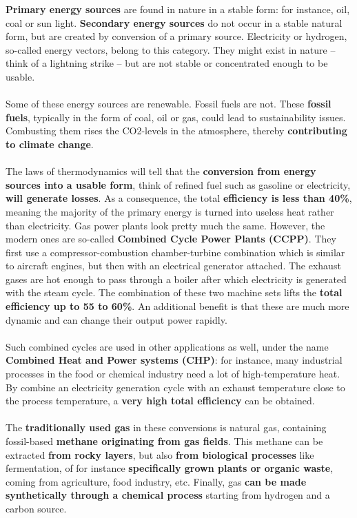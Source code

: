 \documentclass[../summary.tex]{subfiles}
\begin{document}
	\textbf{Primary energy sources} are found in nature in a stable form: for instance, oil, coal or sun light. \textbf{Secondary energy sources} do not occur in a stable natural form, but are created by conversion of a primary source. Electricity or hydrogen, so-called energy vectors, belong to this category. They might exist in nature – think of a lightning strike – but are not stable or concentrated enough to be usable.
	\\\\
	Some of these energy sources are renewable. Fossil fuels are not. These \textbf{fossil fuels}, typically in the form of coal, oil or gas, could lead to sustainability issues. Combusting them rises the CO2-levels in the atmosphere, thereby \textbf{contributing to climate change}. 
	\\\\
	The laws of thermodynamics will tell that the \textbf{conversion from energy sources into a usable form}, think of refined fuel such as gasoline or electricity, \textbf{will generate losses}. As a consequence, the total \textbf{efficiency is less than 40\%}, meaning the majority of the primary energy is turned into useless heat rather than electricity. Gas power plants look pretty much the same. However, the modern ones are so-called \textbf{Combined Cycle Power Plants (CCPP)}. They first use a compressor-combustion chamber-turbine combination which is similar to aircraft engines, but then with an electrical generator attached. The exhaust gases are hot enough to pass through a boiler after which electricity is generated with the steam cycle. The combination of these two machine sets lifts the \textbf{total efficiency up to 55 to 60\%}. An additional benefit is that these are much more dynamic and can change their output power rapidly. 
	\\
	\\
	Such combined cycles are used in other applications as well, under the name \textbf{Combined Heat and Power systems (CHP)}: for instance, many industrial processes in the food or chemical industry need a lot of high-temperature heat. By combine an electricity generation cycle with an exhaust temperature close to the process temperature, a \textbf{very high total efficiency} can be obtained.
	\\\\
	The \textbf{traditionally used gas} in these conversions is natural gas, containing fossil-based \textbf{methane originating from gas fields}. This methane can be extracted \textbf{from rocky layers}, but also \textbf{from biological processes} like fermentation, of for instance \textbf{specifically grown plants or organic waste}, coming from agriculture, food industry, etc. Finally, gas \textbf{can be made synthetically through a chemical process} starting from hydrogen and a carbon source.
	
\end{document}
